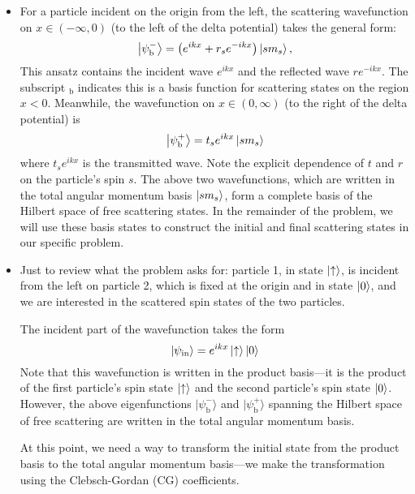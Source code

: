 \documentclass[11pt, a4paper]{article}
\newcommand{\ua}{\uparrow}  %
\newcommand{\bket}[1]{\big | {#1} \big \rangle}  %
\begin{document}
\begin{itemize}
	\item  For a particle incident on the origin from the left, the scattering wavefunction on $ x \in (-\infty, 0) $ (to the left of the delta potential) takes the general form:
	\begin{equation*}
		\bket{\psi_{\text{b}}^{-}} = \left(e^{ik x} + r_{s}e^{-ik x}\right)\ket{sm_{s}},
	\end{equation*}
	This ansatz contains the incident wave $ e^{ikx} $ and the reflected wave $ re^{-ikx} $. The subscript $ {}_{\text{b}} $ indicates this is a basis function for scattering states on the region $ x < 0 $. Meanwhile, the wavefunction on $ x \in (0, \infty)  $ (to the right of the delta potential) is
	\begin{equation*}
		\ket{\psi_{\text{b}}^{+}} = t_{s} e^{ikx}\ket{sm_{s}}
	\end{equation*}
	where $ t_{s}e^{ikx} $ is the transmitted wave. Note the explicit dependence of $ t $ and $ r $ on the particle's spin $ s $. The above two wavefunctions, which are written in the total angular momentum basis $ \ket{sm_{s}} $, form a complete basis of the Hilbert space of free scattering states. In the remainder of the problem, we will use these basis states to construct the initial and final scattering states in our specific problem. 
	

			
	\item Just to review what the problem asks for: particle 1, in state $ \ket{\ua} $, is incident from the left on particle 2, which is fixed at the origin and in state $ \ket{0} $, and we are interested in the scattered spin states of the two particles.
	
	The incident part of the wavefunction takes the form
	\begin{equation*}
		\ket{\psi_{\text{in}}} = e^{ikx} \ket{\ua} \ket{0}
	\end{equation*}
	Note that this wavefunction is written in the product basis---it is the product of the first particle's spin state $ \ket{\ua} $ and the second particle's spin state $ \ket{0} $. However, the above eigenfunctions $ \bket{\psi_{\text{b}}^{-}} $ and $ \bket{\psi_{\text{b}}^{+}} $ spanning the Hilbert space of free scattering are written in the total angular momentum basis.
	
	At this point, we need a way to transform the initial state from the product basis to the total angular momentum basis---we make the transformation using the Clebsch-Gordan (CG) coefficients.
\end{itemize}	
\end{document}
